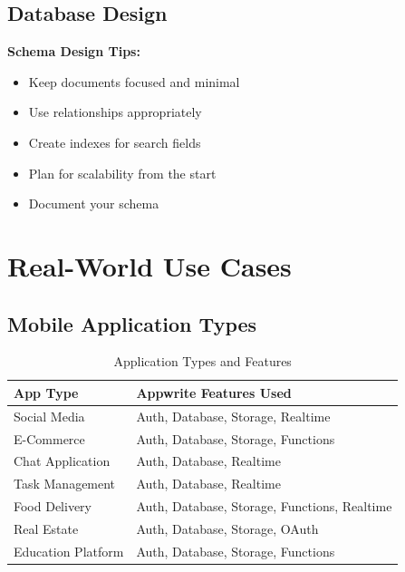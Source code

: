 \documentclass[11pt,a4paper,oneside]{book}
\begin{document}
\section{Database Design}

\begin{notebox}
\textbf{Schema Design Tips:}
\begin{itemize}
    \item Keep documents focused and minimal
    \item Use relationships appropriately
    \item Create indexes for search fields
    \item Plan for scalability from the start
    \item Document your schema
\end{itemize}
\end{notebox}

\chapter{Real-World Use Cases}

\section{Mobile Application Types}

\begin{table}[h]
\centering
\begin{tabularx}{\textwidth}{l X}
\toprule
\textbf{App Type} & \textbf{Appwrite Features Used} \\
\midrule
Social Media & Auth, Database, Storage, Realtime \\
E-Commerce & Auth, Database, Storage, Functions \\
Chat Application & Auth, Database, Realtime \\
Task Management & Auth, Database, Realtime \\
Food Delivery & Auth, Database, Storage, Functions, Realtime \\
Real Estate & Auth, Database, Storage, OAuth \\
Education Platform & Auth, Database, Storage, Functions \\
\bottomrule
\end{tabularx}
\caption{Application Types and Features}
\end{table}
\end{document}
